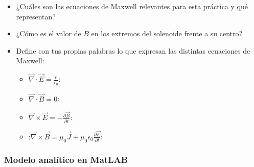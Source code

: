 \begin{itemize}
    \item ¿Cuáles son las ecuaciones de Maxwell relevantes para esta práctica y qué representan?
    \vspace{3cm}
    \item ¿Cómo es el valor de \(B\) en los extremos del solenoide frente a su centro?
    \vspace{3cm}
    \item Define con tus propias palabras lo que expresan las distintas ecuaciones de Maxwell:
    \begin{itemize}
        \item \(\vec{\nabla}\cdot \vec{E}= \frac{\rho}{\epsilon_0}\):
        \vspace{1cm}
        \item \(\vec{\nabla}\cdot \vec{B}=0\): 
        \vspace{1cm}
        \item \(\vec{\nabla}\times\vec{E}=-\frac{\partial\vec{B}}{\partial t}\):
        \vspace{1cm}
        \item:\(\vec{\nabla}\times \vec{B}=\mu_0\vec{J}+\mu_0\epsilon_0\frac{\partial \vec{E}}{\partial t}\):
        \vspace{1cm}
    \end{itemize}
\end{itemize}

\subsubsection*{Modelo analítico en MatLAB}

